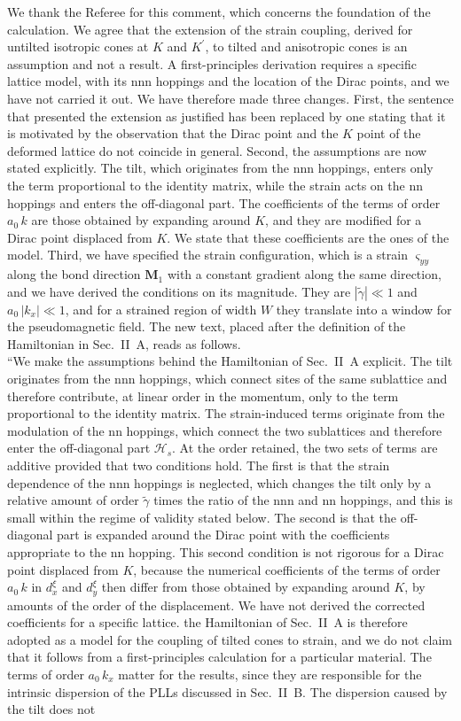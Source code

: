 \documentclass[aps,prb,onecolumn,nofootinbib,citeautoscript,10pt]{revtex4-2}
\DeclareRobustCommand{\bs}[1]{\bm{#1}}
\begin{document}
\begin{enumerate}
We thank the Referee for this comment, which concerns the foundation of the calculation. We agree that the extension of the strain coupling, derived for untilted isotropic cones at $K$ and $K^\prime$, to tilted and anisotropic cones is an assumption and not a result. A first-principles derivation requires a specific lattice model, with its nnn hoppings and the location of the Dirac points, and we have not carried it out. We have therefore made three changes. First, the sentence that presented the extension as justified has been replaced by one stating that it is motivated by the observation that the Dirac point and the $K$ point of the deformed lattice do not coincide in general. Second, the assumptions are now stated explicitly. The tilt, which originates from the nnn hoppings, enters only the term proportional to the identity matrix, while the strain acts on the nn hoppings and enters the off-diagonal part. The coefficients of the terms of order $a_0\,k$ are those obtained by expanding around $K$, and they are modified for a Dirac point displaced from $K$. We state that these coefficients are the ones of the model. Third, we have specified the strain configuration, which is a strain $\varsigma_{yy}$ along the bond direction $\bs M_1$ with a constant gradient along the same direction, and we have derived the conditions on its magnitude. They are $|\tilde\gamma|\ll1$ and $a_0\,|k_x|\ll1$, and for a strained region of width $W$ they translate into a window for the pseudomagnetic field. The new text, placed after the definition of the Hamiltonian in Sec.~II~A, reads as follows.\\``We make the assumptions behind the Hamiltonian of Sec.~II~A explicit. The tilt originates from the nnn hoppings, which connect sites of the same sublattice and therefore contribute, at linear order in the momentum, only to the term proportional to the identity matrix. The strain-induced terms originate from the modulation of the nn hoppings, which connect the two sublattices and therefore enter the off-diagonal part $\mathcal H_s$. At the order retained, the two sets of terms are additive provided that two conditions hold. The first is that the strain dependence of the nnn hoppings is neglected, which changes the tilt only by a relative amount of order $\tilde\gamma$ times the ratio of the nnn and nn hoppings, and this is small within the regime of validity stated below. The second is that the off-diagonal part is expanded around the Dirac point with the coefficients appropriate to the nn hopping. This second condition is not rigorous for a Dirac point displaced from $K$, because the numerical coefficients of the terms of order $a_0\,k$ in $d^\xi_x$ and $d^\xi_y$ then differ from those obtained by expanding around $K$, by amounts of the order of the displacement. We have not derived the corrected coefficients for a specific lattice. the Hamiltonian of Sec.~II~A is therefore adopted as a model for the coupling of tilted cones to strain, and we do not claim that it follows from a first-principles calculation for a particular material. The terms of order $a_0\,k_x$ matter for the results, since they are responsible for the intrinsic dispersion of the PLLs discussed in Sec.~II~B. The dispersion caused by the tilt does not 
\end{enumerate}
\end{document}
